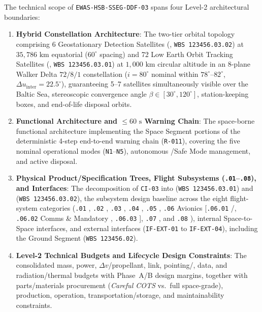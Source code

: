 The technical scope of \texttt{EWAS-HSB-SSEG-DDF-03} spans four Level-2 architectural boundaries:
\begin{enumerate}[leftmargin=1.8em, itemsep=0.2em, topsep=0.2em]
    \item \textbf{Hybrid Constellation Architecture}: The two-tier orbital topology comprising 6 Geostationary Detection Satellites (, \texttt{WBS 123456.03.02}) at $35{,}786\text{ km}$ equatorial ($60^\circ$ spacing) and 72 Low Earth Orbit Tracking Satellites (, \texttt{WBS 123456.03.01}) at $1{,}000\text{ km}$ circular altitude in an 8-plane Walker Delta $72/8/1$ constellation ($i = 80^\circ$ nominal within $78^\circ\text{--}82^\circ$, $\Delta u_{\text{inter}} = 22.5^\circ$), guaranteeing 5--7 satellites simultaneously visible over the Baltic Sea, stereoscopic convergence angle $\beta \in [30^\circ, 120^\circ]$, station-keeping boxes, and end-of-life disposal orbits.
    \item \textbf{Functional Architecture and $\le 60\text{ s}$ Warning Chain}: The space-borne functional architecture implementing the Space Segment portions of the deterministic 4-step end-to-end warning chain (\texttt{R-011}), covering the five nominal operational modes (\texttt{N1}--\texttt{N5}), autonomous /Safe Mode management, and active  disposal.
    \item \textbf{Physical Product/Specification Trees, Flight Subsystems (\texttt{.01}--\texttt{.08}), and Interfaces}: The decomposition of \texttt{CI-03} into  (\texttt{WBS 123456.03.01}) and  (\texttt{WBS 123456.03.02}), the subsystem design baseline across the eight  flight-system categories (\texttt{.01} , \texttt{.02} , \texttt{.03} , \texttt{.04} , \texttt{.05} , \texttt{.06} Avionics [\texttt{.06.01} /, \texttt{.06.02} Comms \& Mandatory , \texttt{.06.03} ], \texttt{.07} , and \texttt{.08} ), internal Space-to-Space interfaces, and external interfaces (\texttt{IF-EXT-01} to \texttt{IF-EXT-04}), including the Ground Segment (\texttt{WBS 123456.02}).
    \item \textbf{Level-2 Technical Budgets and Lifecycle Design Constraints}: The consolidated mass, power, $\Delta v$/propellant, link, pointing/, data, and radiation/thermal budgets with Phase~A/B design margins, together with parts/materials procurement (\emph{Careful COTS} vs.\ full space-grade), production, operation, transportation/storage, and maintainability constraints.
\end{enumerate}

